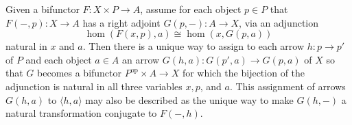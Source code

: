 Given a bifunctor $F: X \times P \to A$, assume for each object $p \in P$ that $F(-, p): X \to A$ has a right adjoint $G(p, -): A \to X$, via an adjunction
$$\hom(F(x, p), a) \cong \hom(x, G(p, a))$$
natural in $x$ and $a$. Then there is a unique way to assign to each arrow $h: p \to p'$ of $P$ and each object $a \in A$ an arrow $G(h, a): G(p', a) \to G(p, a)$ of $X$ so that $G$ becomes a bifunctor $P^{\text{op}} \times A \to X$ for which the bijection of the adjunction is natural in all three variables $x, p$, and $a$. This assignment of arrows $G(h, a)$ to $\langle h, a \rangle$ may also be described as the unique way to make $G(h, -)$ a natural transformation conjugate to $F(-, h)$.
